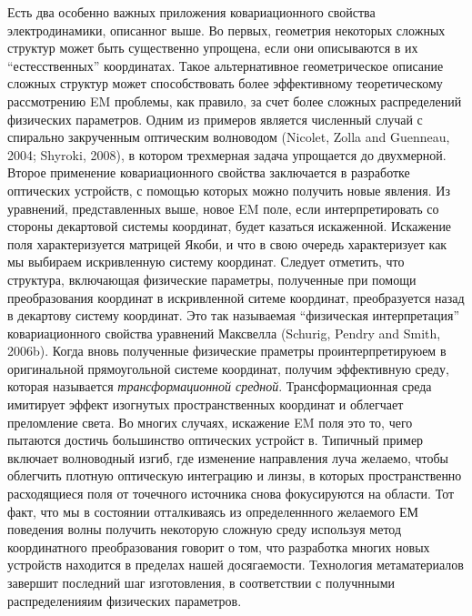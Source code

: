 \documentclass[12pt,a4paper]{article}
\begin{document}
Есть два особенно важных приложения ковариационного свойства электродинамики, описанног выше. Во первых,
геометрия некоторых сложных структур может быть существенно упрощена, если они описываются в их 
``естесственных'' координатах. Такое альтернативное геометрическое описание сложных структур может 
способствовать более эффективному теоретическому рассмотрению EM проблемы, как правило, за счет более
сложных распределений физических параметров. Одним из примеров является численный случай с спирально
закрученным оптическим волноводом  (Nicolet, Zolla and Guenneau, 2004; Shyroki, 2008), в котором 
трехмерная задача упрощается до двухмерной. Второе применение ковариационного свойства заключается
в разработке оптических устройств, с помощью которых можно получить новые явления. Из уравнений,
представленных выше, новое EM поле, если интерпретировать со стороны декартовой системы координат,
будет казаться искаженной. Искажение поля характеризуется матрицей Якоби, и что в свою очередь 
характеризует как мы выбираем искривленную систему координат. Следует отметить, что структура, 
включающая физические параметры, полученные при помощи преобразования координат в искривленной ситеме
координат, преобразуется назад в декартову систему координат. Это так называемая 
``физическая интерпретация'' ковариационного свойства уравнений Максвелла (Schurig, Pendry and Smith, 
2006b). Когда вновь полученные физические праметры проинтерпретируюем в оригинальной прямоугольной 
системе координат, получим эффективную среду, которая называется \textit{трансформационной средной}.
Трансформационная среда имитирует эффект изогнутых пространственных координат и облегчает преломление 
света. Во многих случаях, искажение EM поля это то, чего пытаются достичь большинство оптических устройст
в. Типичный пример включает волноводный изгиб, где изменение направления луча желаемо, чтобы облегчить
плотную оптическую интеграцию и линзы, в которых пространственно расходящиеся поля от точечного 
источника снова фокусируются на области. Тот факт, что мы в состоянии отталкиваясь из определеннного 
желаемого ЕМ поведения волны получить некоторую сложную среду используя метод координатного 
преобразования говорит о том, что разработка многих новых устройств находится в пределах нашей 
досягаемости. Технология метаматериалов завершит последний шаг изготовления, в соответствии с получнными 
распределенияим физических параметров.
\end{document}
